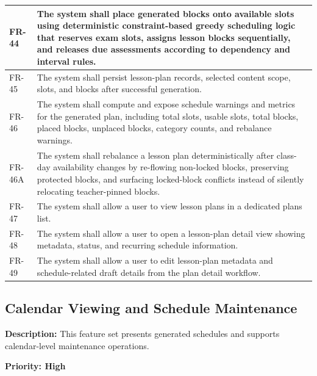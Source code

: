 \documentclass[12pt]{article}
\begin{document}
\begin{longtable}{|L{2.3cm}|L{11.3cm}|}
\hline
FR-44 & The system shall place generated blocks onto available slots using deterministic constraint-based greedy scheduling logic that reserves exam slots, assigns lesson blocks sequentially, and releases due assessments according to dependency and interval rules. \\
\hline
FR-45 & The system shall persist lesson-plan records, selected content scope, slots, and blocks after successful generation. \\
\hline
FR-46 & The system shall compute and expose schedule warnings and metrics for the generated plan, including total slots, usable slots, total blocks, placed blocks, unplaced blocks, category counts, and rebalance warnings. \\
\hline
FR-46A & The system shall rebalance a lesson plan deterministically after class-day availability changes by re-flowing non-locked blocks, preserving protected blocks, and surfacing locked-block conflicts instead of silently relocating teacher-pinned blocks. \\
\hline
FR-47 & The system shall allow a user to view lesson plans in a dedicated plans list. \\
\hline
FR-48 & The system shall allow a user to open a lesson-plan detail view showing metadata, status, and recurring schedule information. \\
\hline
FR-49 & The system shall allow a user to edit lesson-plan metadata and schedule-related draft details from the plan detail workflow. \\
\hline
\end{longtable}

\subsection{Calendar Viewing and Schedule Maintenance}

\textbf{Description:} This feature set presents generated schedules and supports
calendar-level maintenance operations.

\textbf{Priority: High}
\end{document}
